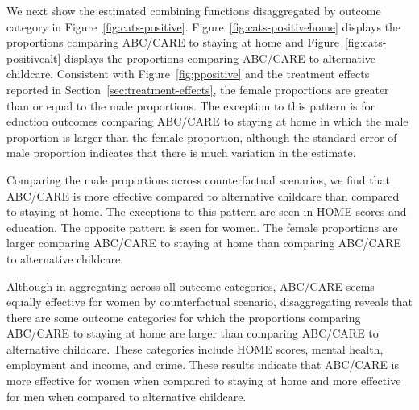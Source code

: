 We next show the estimated combining functions disaggregated by outcome category in Figure~\ref{fig:cats-positive}. Figure~\ref{fig:cats-positivehome} displays the proportions comparing ABC/CARE to staying at home and Figure~\ref{fig:cats-positivealt} displays the proportions comparing ABC/CARE to alternative childcare. Consistent with Figure~\ref{fig:ppositive} and the treatment effects reported in Section~\ref{sec:treatment-effects}, the female proportions are greater than or equal to the male proportions. The exception to this pattern is for eduction outcomes comparing ABC/CARE to staying at home in which the male proportion is larger than the female proportion, although the standard error of male proportion indicates that there is much variation in the estimate. 

Comparing the male proportions across counterfactual scenarios, we find that ABC/CARE is more effective compared to alternative childcare than compared to staying at home. The exceptions to this pattern are seen in HOME scores and education. The opposite pattern is seen for women. The female proportions are larger comparing ABC/CARE to staying at home than comparing ABC/CARE to alternative childcare. 

Although in aggregating across all outcome categories, ABC/CARE seems equally effective for women by counterfactual scenario, disaggregating reveals that there are some outcome categories for which the proportions comparing ABC/CARE to staying at home are larger than comparing ABC/CARE to alternative childcare. These categories include HOME scores, mental health, employment and income, and crime. These results indicate that ABC/CARE is more effective for women when compared to staying at home and more effective for men when compared to alternative childcare.

